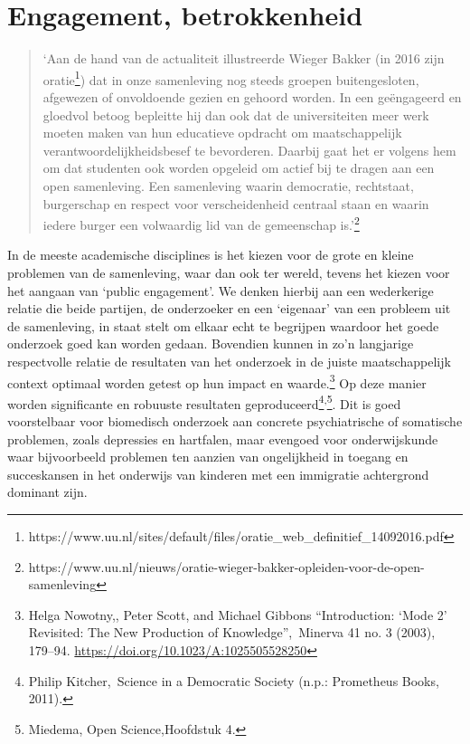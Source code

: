 \documentclass{jote-book}
\begin{document}
	\section{Engagement, betrokkenheid}

	\begin{quote}
		\itshape

		‘Aan de hand van de actualiteit illustreerde Wieger Bakker (in 2016 zijn oratie\footnote{https://www.uu.nl/sites/default/files/oratie\_web\_definitief\_14092016.pdf}) dat in onze samenleving nog steeds groepen buitengesloten, afgewezen of onvoldoende gezien en gehoord worden. In een geëngageerd en gloedvol betoog bepleitte hij dan ook dat de universiteiten meer werk moeten maken van hun educatieve opdracht om maatschappelijk verantwoordelijkheidsbesef te bevorderen. Daarbij gaat het er volgens hem om dat studenten ook worden opgeleid om actief bij te dragen aan een open samenleving. Een samenleving waarin democratie, rechtstaat, burgerschap en respect voor verscheidenheid centraal staan en waarin iedere burger een volwaardig lid van de gemeenschap is.'\footnote{https://www.uu.nl/nieuws/oratie-wieger-bakker-opleiden-voor-de-open-samenleving}
	\end{quote}

	In de meeste academische disciplines is het kiezen voor de grote en kleine problemen van de samenleving, waar dan ook ter wereld, tevens het kiezen voor het aangaan van ‘public engagement'. We denken hierbij aan een wederkerige relatie die beide partijen, de onderzoeker en een ‘eigenaar' van een probleem uit de samenleving, in staat stelt om elkaar echt te begrijpen waardoor het goede onderzoek goed kan worden gedaan. Bovendien kunnen in zo'n langjarige respectvolle relatie de resultaten van het onderzoek in de juiste maatschappelijk context optimaal worden getest op hun impact en waarde.\footnote{Helga Nowotny,, Peter Scott, and Michael Gibbons “Introduction: ‘Mode 2' Revisited: The New Production of Knowledge”, Minerva 41 no. 3 (2003), 179--94. \href{about:blank}{https://doi.org/10.1023/A:1025505528250}} Op deze manier worden significante en robuuste resultaten geproduceerd\footnote{Philip Kitcher, Science in a Democratic Society (n.p.: Prometheus Books, 2011).}\textsuperscript{,}\footnote{Miedema, Open Science,Hoofdstuk 4.}. Dit is goed voorstelbaar voor biomedisch onderzoek aan concrete psychiatrische of somatische problemen, zoals depressies en hartfalen, maar evengoed voor onderwijskunde waar bijvoorbeeld problemen ten aanzien van ongelijkheid in toegang en succeskansen in het onderwijs van kinderen met een immigratie achtergrond dominant zijn.
\end{document}
